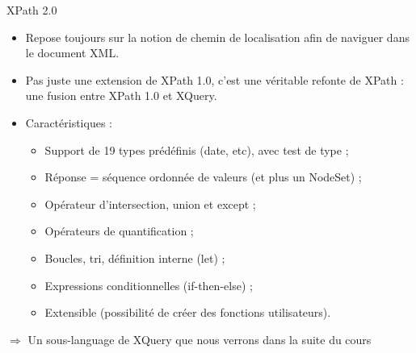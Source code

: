 \begin{frame}{XPath 2.0}

 \begin{itemize}
 \item Repose toujours sur la notion de chemin de localisation afin de naviguer dans le document XML.
\item Pas juste une extension de XPath 1.0, c'est une v\'eritable refonte de XPath : une fusion entre XPath 1.0 et XQuery.
\item Caract\'eristiques :
\begin{itemize}
\item Support de 19 types pr\'ed\'efinis (date, etc), avec test de type ;
\item R\'eponse = s\'equence ordonn\'ee de valeurs (et plus un NodeSet) ; 
\item Op\'erateur d'intersection, union et except ;
\item Op\'erateurs de quantification ;
\item Boucles, tri, d\'efinition interne (let) ;
\item Expressions conditionnelles (if-then-else) ;
\item Extensible (possibilit\'e de cr\'eer des fonctions utilisateurs).
\end{itemize}
 \end{itemize}

 $\Rightarrow$ Un sous-language de XQuery que nous verrons dans la suite du cours

\end{frame}





